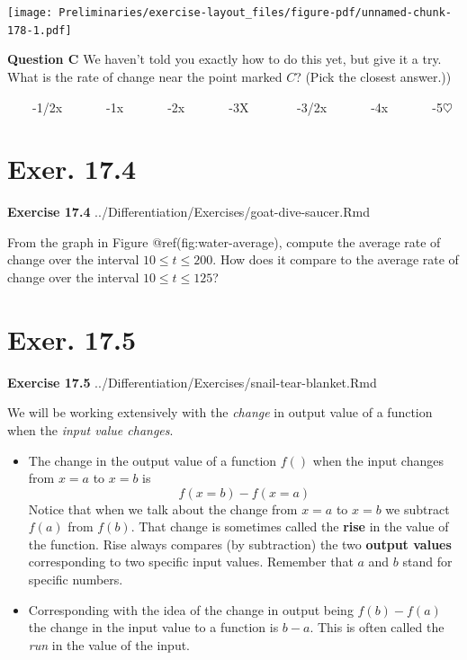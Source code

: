 \documentclass[
  letterpaper,
  DIV=11,
  numbers=noendperiod,
  oneside]{article}
\begin{document}
\begin{multicols}{2}
\texttt{[image: Preliminaries/exercise-layout\_files/figure-pdf/unnamed-chunk-178-1.pdf]}

\textbf{Question C} We haven't told you exactly how to do this yet, but
give it a try. What is the rate of change near the point marked \(C\)?
(Pick the closest answer.))

~~~~{-1/2{x}}~~~~~~~{-1{x}}~~~~~~~{-2{x}}~~~~~~~{-3{︎X
}}~~~~~~~{-3/2{x}}~~~~~~~{-4{x}}~~~~~~~{-5{\(\heartsuit\ \)}}

\hypertarget{exer.-17.4}{%
\section*{Exer. 17.4}\label{exer.-17.4}}

\textbf{Exercise 17.4} ../Differentiation/Exercises/goat-dive-saucer.Rmd

From the graph in Figure @ref(fig:water-average), compute the average
rate of change over the interval \(10 \leq t \leq 200\). How does it
compare to the average rate of change over the interval
\(10 \leq t \leq 125\)?

\hypertarget{exer.-17.5}{%
\section*{Exer. 17.5}\label{exer.-17.5}}

\textbf{Exercise 17.5}
../Differentiation/Exercises/snail-tear-blanket.Rmd

We will be working extensively with the \emph{change} in output value of
a function when the \emph{input value changes}.

\begin{itemize}
\item
  The change in the output value of a function \(f()\) when the input
  changes from \(x = a\) to \(x = b\) is \[f(x=b) - f(x=a)\] Notice that
  when we talk about the change from \(x=a\) to \(x=b\) we subtract
  \(f(a)\) from \(f(b)\). That change is sometimes called the
  \textbf{rise} in the value of the function. Rise always compares (by
  subtraction) the two \textbf{output values} corresponding to two
  specific input values. Remember that \(a\) and \(b\) stand for
  specific numbers.
\item
  Corresponding with the idea of the change in output being
  \(f(b) - f(a)\) the change in the input value to a function is
  \(b - a\). This is often called the \emph{run} in the value of the
  input.
\end{itemize}


\end{multicols}
\end{document}
